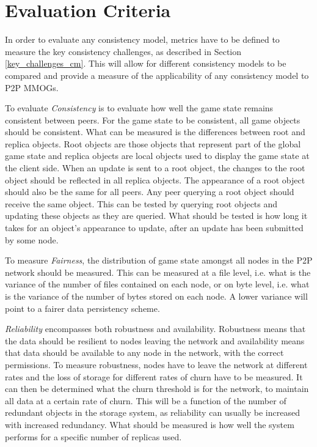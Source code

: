 \documentclass[10pt,a4paper,journal,cspaper,compsoc]{IEEEtran}
\begin{document}
\section{Evaluation Criteria}
\label{eval_crit}

In order to evaluate any consistency model, metrics have to be defined to measure the key consistency challenges, as described in Section
\ref{key_challenges_cm}. This will allow for different consistency models to be compared and provide a measure of the applicability of any
consistency model to P2P MMOGs.

To evaluate \emph{Consistency} is to evaluate how well the game state remains consistent between peers. For the game state to be consistent, all game
objects should be consistent. What can be measured is the differences between root and replica objects. Root objects are those objects that represent
part of the global game state and replica objects are local objects used to display the game state at the client side. When an update is sent to a
root object, the changes to the root object should be reflected in all replica objects. The appearance of a root object should also be the same for
all peers. Any peer querying a root object should receive the same object. This can be tested by querying root objects and updating these objects as
they are queried. What should be tested is how long it takes for an object's appearance to update, after an update has been submitted by some node.

To measure \emph{Fairness}, the distribution of game state amongst all nodes in the P2P network should be measured. This can be measured at a file
level, i.e. what is the variance of the number of files contained on each node, or on byte level, i.e. what is the variance of the number of bytes
stored on each node. A lower variance will point to a fairer data persistency scheme.

\emph{Reliability} encompasses both robustness and availability. Robustness means that the data should be resilient to nodes leaving the network and
availability means that data should be available to any node in the network, with the correct permissions. To measure robustness, nodes have to leave
the network at different rates and the loss of storage for different rates of churn have to be measured. It can then be determined what the churn
threshold is for the network, to maintain all data at a certain rate of churn. This will be a function of the number of redundant objects in the
storage system, as reliability can usually be increased with increased redundancy. What should be measured is how well the system performs for a
specific number of replicas used.
\end{document}

